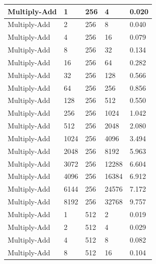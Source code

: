 \documentclass{article}
\begin{document}
\begin{longtable}{|l|l|l|l|l|}
Multiply-Add       & 1    & 256         & 4                 & 0.020             \\ \hline
Multiply-Add       & 2    & 256         & 8                 & 0.040             \\ \hline
Multiply-Add       & 4    & 256         & 16                & 0.079             \\ \hline
Multiply-Add       & 8    & 256         & 32                & 0.134             \\ \hline
Multiply-Add       & 16   & 256         & 64                & 0.282             \\ \hline
Multiply-Add       & 32   & 256         & 128               & 0.566             \\ \hline
Multiply-Add       & 64   & 256         & 256               & 0.856             \\ \hline
Multiply-Add       & 128  & 256         & 512               & 0.550             \\ \hline
Multiply-Add       & 256  & 256         & 1024              & 1.042             \\ \hline
Multiply-Add       & 512  & 256         & 2048              & 2.080             \\ \hline
Multiply-Add       & 1024 & 256         & 4096              & 3.494             \\ \hline
Multiply-Add       & 2048 & 256         & 8192              & 5.963             \\ \hline
Multiply-Add       & 3072 & 256         & 12288             & 6.604             \\ \hline
Multiply-Add       & 4096 & 256         & 16384             & 6.912             \\ \hline
Multiply-Add       & 6144 & 256         & 24576             & 7.172             \\ \hline
Multiply-Add       & 8192 & 256         & 32768             & 9.757             \\ \hline
Multiply-Add       & 1    & 512         & 2                 & 0.019             \\ \hline
Multiply-Add       & 2    & 512         & 4                 & 0.029             \\ \hline
Multiply-Add       & 4    & 512         & 8                 & 0.082             \\ \hline
Multiply-Add       & 8    & 512         & 16                & 0.104             \\ \hline

\end{longtable}
\end{document}

